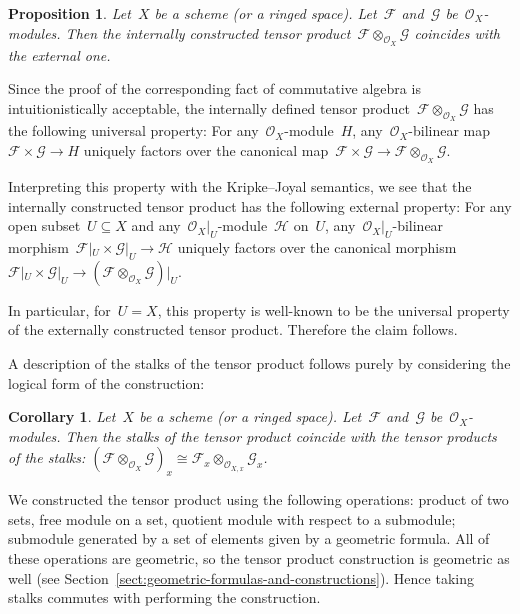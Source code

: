 \documentclass[10pt,reqno,a4paper]{amsbook}
\makeatletter
\theoremstyle{definition}
\theoremstyle{plain}
\newtheorem{prop}[defn]{Proposition}
\newtheorem{cor}[defn]{Corollary}
\theoremstyle{remark}
\newcommand{\F}{\mathcal{F}}
\renewcommand{\G}{\mathcal{G}}
\renewcommand{\H}{\mathcal{H}}
\renewcommand{\O}{\mathcal{O}}
\newcommand{\?}{\,{:}\,}
\renewcommand{\_}{\mathpunct{.}\,}
\renewenvironment{proof}[1][\proofname]{\par
  \pushQED{\qed}%
  \normalfont \topsep6\p@\@plus6\p@\relax
  \trivlist
  \item[\hskip\labelsep
        \itshape
    #1\@addpunct{.}]\ignorespaces
}{%
  \popQED\endtrivlist\@endpefalse
}
\makeatother
\begin{document}
\begin{prop}\label{prop:internal-tensor-product}
Let~$X$ be a scheme (or a ringed space). Let~$\F$ and~$\G$
be~$\O_X$-modules. Then the internally constructed tensor product~$\F
\otimes_{\O_X} \G$ coincides with the external one.
\end{prop}
\begin{proof}
Since the proof of the corresponding fact of commutative algebra is
intuitionistically acceptable, the internally defined tensor product~$\F \otimes_{\O_X} \G$
has the following universal property: For any~$\O_X$-module~$H$,
any~$\O_X$-bilinear map~$\F \times \G \to H$ uniquely factors over the
canonical map~$\F \times \G \to \F \otimes_{\O_X} \G$.

Interpreting this property with the Kripke--Joyal semantics, we see that the
internally constructed tensor product has the following external property:
For any open subset~$U \subseteq X$ and any~$\O_X|_U$-module~$\H$ on~$U$,
any~$\O_X|_U$-bilinear morphism~$\F|_U \times \G|_U \to \H$ uniquely factors over the
canonical morphism~$\F|_U \times \G|_U \to (\F \otimes_{\O_X} \G)|_U$.

In particular, for~$U = X$, this property is well-known to be the universal
property of the externally constructed tensor product. Therefore the
claim follows.
\end{proof}

A description of the stalks of the tensor product
follows purely by considering the logical form of the construction:
\begin{cor}Let~$X$ be a scheme (or a ringed space). Let~$\F$ and~$\G$
be~$\O_X$-modules. Then the stalks of the tensor product coincide with the
tensor products of the stalks: $(\F \otimes_{\O_X} \G)_x \cong \F_x
\otimes_{\O_{X,x}} \G_x$.\end{cor}
\begin{proof}
We constructed the tensor product using the following operations: product of
two sets, free module on a set, quotient module with respect to a submodule;
submodule generated by a set of elements given by a geometric formula.
All of these operations are geometric, so the tensor product construction is
geometric as well (see Section~\ref{sect:geometric-formulas-and-constructions}). Hence taking stalks commutes with performing the
construction.
\end{proof}
\end{document}
